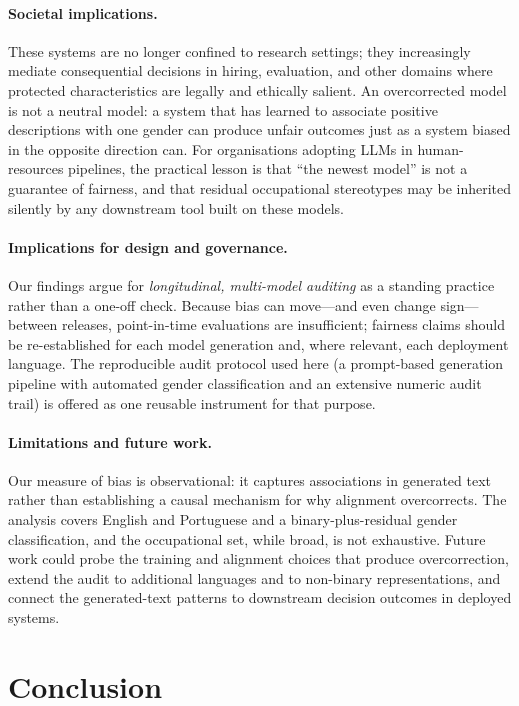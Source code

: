 \documentclass[12pt,a4paper]{article}
\begin{document}
\paragraph{Societal implications.} These systems are no longer confined to research
settings; they increasingly mediate consequential decisions in hiring, evaluation, and
other domains where protected characteristics are legally and ethically salient. An
overcorrected model is not a neutral model: a system that has learned to associate positive
descriptions with one gender can produce unfair outcomes just as a system biased in the
opposite direction can. For organisations adopting LLMs in human-resources pipelines, the
practical lesson is that ``the newest model'' is not a guarantee of fairness, and that
residual occupational stereotypes may be inherited silently by any downstream tool built on
these models.

\paragraph{Implications for design and governance.} Our findings argue for
\emph{longitudinal, multi-model auditing} as a standing practice rather than a one-off
check. Because bias can move---and even change sign---between releases, point-in-time
evaluations are insufficient; fairness claims should be re-established for each model
generation and, where relevant, each deployment language. The reproducible audit protocol
used here (a prompt-based generation pipeline with automated gender classification and an
extensive numeric audit trail) is offered as one reusable instrument for that purpose.

\paragraph{Limitations and future work.} Our measure of bias is observational: it captures
associations in generated text rather than establishing a causal mechanism for why
alignment overcorrects. The analysis covers English and Portuguese and a binary-plus-residual
gender classification, and the occupational set, while broad, is not exhaustive. Future work
could probe the training and alignment choices that produce overcorrection, extend the audit
to additional languages and to non-binary representations, and connect the generated-text
patterns to downstream decision outcomes in deployed systems.

\section{Conclusion}
\end{document}
